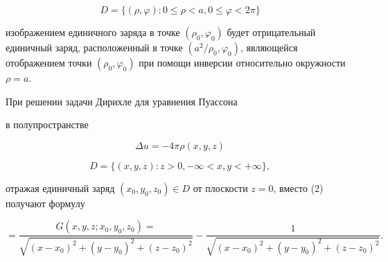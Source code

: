 \documentclass[10pt]{article}
\begin{document}
\[

D=\{(\rho, \varphi): 0 \leqslant \rho<a, 0 \leqslant \varphi<2 \pi\}

\]



изображением единичного заряда в точке $\left(\rho_{0}, \varphi_{0}\right)$ будет отрицательный единичный заряд, расположенный в точке $\left(a^{2} / \rho_{0}, \varphi_{0}\right)$, являющейся отображением точки $\left(\rho_{0}, \varphi_{0}\right)$ при помощи инверсии относительно окружности $\rho=a$.



При решении задачи Дирихле для уравнения Пуассона



в полупространстве



\[

\Delta u=-4 \pi \rho(x, y, z)

\]



\[

D=\{(x, y, z): z>0,-\infty<x, y<+\infty\},

\]



отражая единичный заряд $\left(x_{0}, y_{0}, z_{0}\right) \in D$ от плоскости $z=0$, вместо (2) получают формулу



\[

=\frac{G\left(x, y, z ; x_{0}, y_{0}, z_{0}\right)=}{\sqrt{\left(x-x_{0}\right)^{2}+\left(y-y_{0}\right)^{2}+\left(z-z_{0}\right)^{2}}}-\frac{1}{\sqrt{\left(x-x_{0}\right)^{2}+\left(y-y_{0}\right)^{2}+\left(z-z_{0}\right)^{2}}} .

\]
\end{document}
